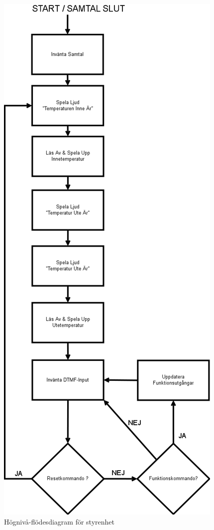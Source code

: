\documentclass[a4paper,11pt]{article}
\begin{document}
		\begin{figure}[H]
		  \centering
		      \includegraphics[scale=0.35, angle=0]{ControlUnitFlowChart.png}
		  	\caption{Högnivå-flödesdiagram för styrenhet}
			\label{fig:CUFlowChart}
		\end{figure}
\end{document}
